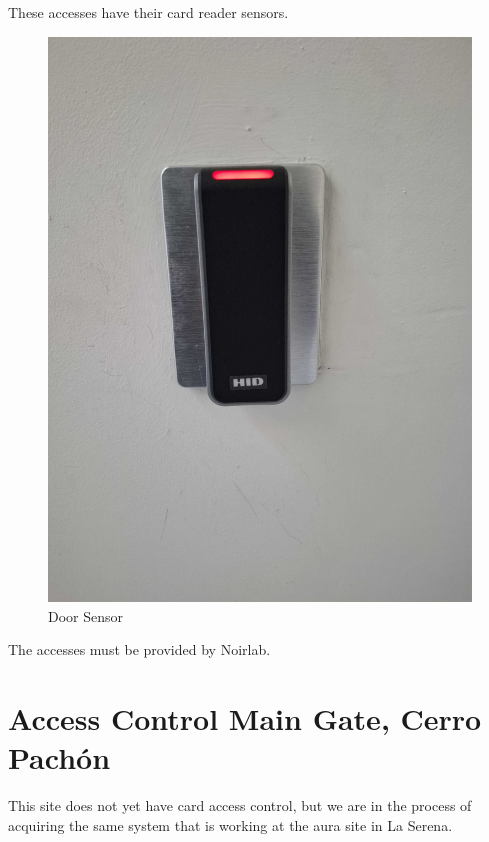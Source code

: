   \newpage

These accesses have their card reader sensors.

\begin{figure}
    \includegraphics[width=12cm]{19.jpg}
    \centering
    \caption*{Door Sensor}
  \end{figure}

The accesses must be provided by Noirlab.

\section{Access Control Main Gate, Cerro Pachón}

This site does not yet have card access control, but we are in the process of acquiring the same system that is working at the aura site in La Serena.


